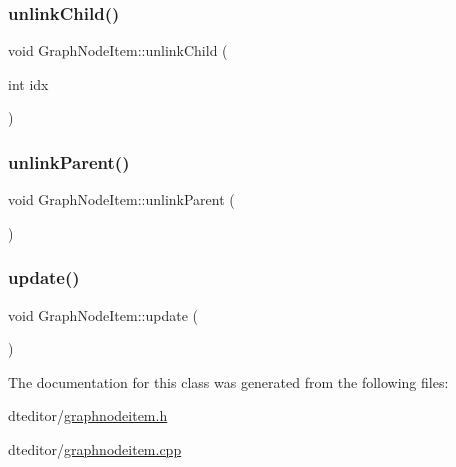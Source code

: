 \mbox{\label{class_graph_node_item_ac5b960d911669556e574385df1ffd983}} 
\subsubsection{\texorpdfstring{unlinkChild()}{unlinkChild()}}
{\footnotesize\ttfamily void Graph\+Node\+Item\+::unlink\+Child (\begin{DoxyParamCaption}\item[{int}]{idx }\end{DoxyParamCaption})}

\mbox{\label{class_graph_node_item_ac873766a72d3e5f0081d3f5db5e21943}} 
\subsubsection{\texorpdfstring{unlinkParent()}{unlinkParent()}}
{\footnotesize\ttfamily void Graph\+Node\+Item\+::unlink\+Parent (\begin{DoxyParamCaption}{ }\end{DoxyParamCaption})}

\mbox{\label{class_graph_node_item_ac0ead52a3a186501534ccfb1e07453b9}} 
\subsubsection{\texorpdfstring{update()}{update()}}
{\footnotesize\ttfamily void Graph\+Node\+Item\+::update (\begin{DoxyParamCaption}{ }\end{DoxyParamCaption})}



The documentation for this class was generated from the following files\+:\begin{DoxyCompactItemize}
\item 
dteditor/\mbox{\hyperlink{graphnodeitem_8h}{graphnodeitem.\+h}}\item 
dteditor/\mbox{\hyperlink{graphnodeitem_8cpp}{graphnodeitem.\+cpp}}\end{DoxyCompactItemize}
